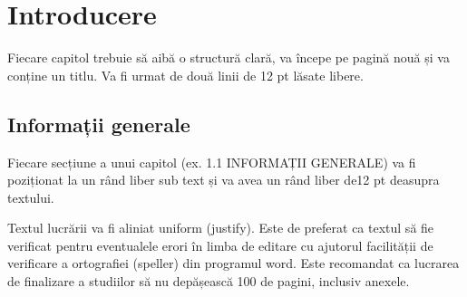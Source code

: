 \chapter{Introducere}
\thispagestyle{pagestyle}

Fiecare capitol trebuie să aibă o structură clară, va începe pe pagină nouă și va conține un titlu. Va fi urmat de două linii de 12 pt lăsate libere.

\section{Informații generale}

Fiecare secțiune a unui capitol (ex. 1.1 INFORMAȚII GENERALE) va fi poziționat la un rând liber sub text și va avea un rând liber de12 pt deasupra textului. 

Textul lucrării va fi aliniat uniform (justify). Este de preferat ca textul să fie verificat pentru eventualele erori în limba de editare cu ajutorul facilității de verificare a ortografiei (speller) din programul word. Este recomandat ca lucrarea de finalizare a studiilor să nu depășească 100 de pagini, inclusiv anexele.

